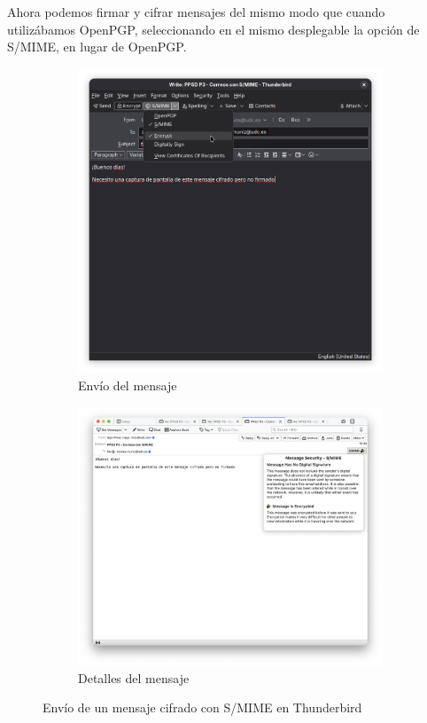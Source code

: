Ahora podemos firmar y cifrar mensajes del mismo modo que cuando utilizábamos OpenPGP, seleccionando en el mismo desplegable la opción de S/MIME, en lugar de OpenPGP.

\begin{figure}[H]
    \centering
    \begin{subfigure}{.5\textwidth}
        \centering
        \includegraphics[width=\linewidth]{thunderbird-smime-cifrado.png}
        \caption{Envío del mensaje}
    \end{subfigure}%
    \begin{subfigure}{.5\textwidth}
        \centering
        \includegraphics[width=\linewidth]{thunderbird-smime-detalles-cifrado.png}
        \caption{Detalles del mensaje}
    \end{subfigure}
    \caption{Envío de un mensaje cifrado con S/MIME en Thunderbird}
\end{figure}

